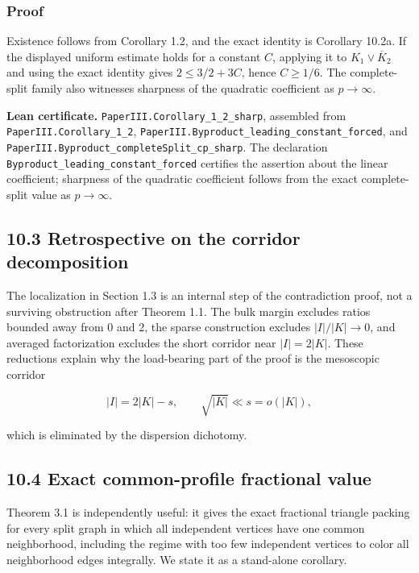 \documentclass[
  american,
  11pt,
  a4paper,
]{article}
\begin{document}
\subsubsection{Proof}\label{proof-7}

Existence follows from Corollary 1.2, and the exact identity is Corollary 10.2a. If the displayed uniform estimate holds for a constant \(C\), applying it to \(K_1\vee\overline K_2\) and using the exact identity gives \(2\le3/2+3C\), hence \(C\ge1/6\). The complete-split family also witnesses sharpness of the quadratic coefficient as \(p\to\infty\).

\textbf{Lean certificate.} \texttt{PaperIII.Corollary\_1\_2\_sharp}, assembled from \texttt{PaperIII.Corollary\_1\_2}, \texttt{PaperIII.Byproduct\_leading\_constant\_forced}, and \texttt{PaperIII.Byproduct\_completeSplit\_cp\_sharp}. The declaration \texttt{Byproduct\_leading\_constant\_forced} certifies the assertion about the linear coefficient; sharpness of the quadratic coefficient follows from the exact complete-split value as \(p\to\infty\).

\subsection{10.3 Retrospective on the corridor decomposition}\label{retrospective-on-the-corridor-decomposition}

The localization in Section 1.3 is an internal step of the contradiction proof, not a surviving obstruction after Theorem 1.1. The bulk margin excludes ratios bounded away from \(0\) and \(2\), the sparse construction excludes \(|I|/|K|\to0\), and averaged factorization excludes the short corridor near \(|I|=2|K|\). These reductions explain why the load-bearing part of the proof is the mesoscopic corridor

\[
|I|=2|K|-s,
\qquad
\sqrt{|K|}\ll s=o(|K|),
\]

which is eliminated by the dispersion dichotomy.

\subsection{10.4 Exact common-profile fractional value}\label{exact-common-profile-fractional-value}

Theorem 3.1 is independently useful: it gives the exact fractional triangle packing for every split graph in which all independent vertices have one common neighborhood, including the regime with too few independent vertices to color all neighborhood edges integrally. We state it as a stand-alone corollary.
\end{document}
